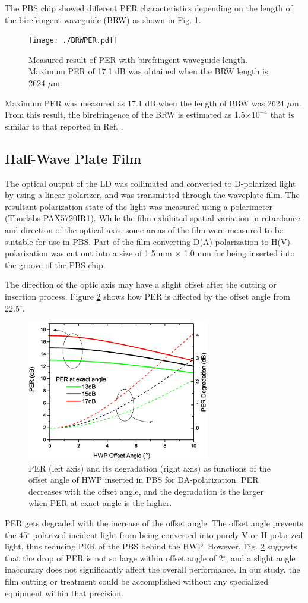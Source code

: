 \documentclass[letterpaper, 10pt]{article}
\begin{document}
The PBS chip showed different PER characteristics depending on the length of the birefringent waveguide (BRW) as shown in Fig. \ref{fig:BRW-PER}.
\begin{figure}
  \centering
  \texttt{[image: ./BRWPER.pdf]}
  \caption{Measured result of PER with birefringent waveguide length. Maximum PER of 17.1 dB was obtained when the BRW length is 2624 $\mu$m.}
  \label{fig:BRW-PER}
\end{figure}
Maximum PER was measured as 17.1 dB  when the length of BRW was 2624 $\mu$m.
From this result, the birefringence of the BRW is estimated as 1.5$\times 10^{-4}$ that is similar to that reported in Ref. \cite{Hashizume:2015ta}.


\subsection{Half-Wave Plate Film}
The optical output of the LD  was collimated and converted to D-polarized light by using a linear polarizer, and was transmitted through the waveplate film.
The resultant polarization state of the light was measured using a polarimeter (Thorlabs PAX5720IR1).
While the film exhibited spatial variation in retardance and direction of the optical axis, some areas of the film were measured to be suitable for use in PBS.
Part of the film converting D(A)-polarization to H(V)-polarization was cut out into a size of 1.5 mm $\times$ 1.0 mm for being inserted into the groove of the PBS chip.

The direction of the optic axis may have a slight offset after the cutting  or  insertion process.
Figure \ref{fig:angle_offset} shows how PER is affected by the offset angle from 22.5$^\circ$.
\begin{figure}
  \centering
  \includegraphics[width=8cm]{./offset_angle}
  \caption{PER (left axis) and its degradation (right axis) as functions of the offset angle of HWP inserted in PBS for DA-polarization. PER decreases with the offset angle, and the degradation is the larger when PER at exact angle is the higher.}
  \label{fig:angle_offset}
\end{figure}
PER gets degraded with the increase of the offset angle.
The offset angle prevents the 45$^\circ$ polarized incident light from being converted into purely V-or H-polarized light, thus reducing PER of the PBS behind the HWP.
However, Fig. \ref{fig:angle_offset} suggests that the drop of PER is not so large within  offset angle of 2$^\circ$, and  a slight angle inaccuracy does not significantly affect the overall performance.
In our study, the film cutting or treatment could be accomplished without any specialized equipment within that precision.
\end{document}
